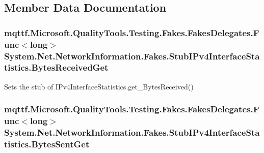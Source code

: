 \subsection{Member Data Documentation}
\hypertarget{class_system_1_1_net_1_1_network_information_1_1_fakes_1_1_stub_i_pv4_interface_statistics_a0b508994533b665567eedb00b1afb581}{
\subsubsection[{Bytes\-Received\-Get}]{\setlength{\rightskip}{0pt plus 5cm}mqttf.\-Microsoft.\-Quality\-Tools.\-Testing.\-Fakes.\-Fakes\-Delegates.\-Func$<$long$>$ System.\-Net.\-Network\-Information.\-Fakes.\-Stub\-I\-Pv4\-Interface\-Statistics.\-Bytes\-Received\-Get}}\label{class_system_1_1_net_1_1_network_information_1_1_fakes_1_1_stub_i_pv4_interface_statistics_a0b508994533b665567eedb00b1afb581}


Sets the stub of I\-Pv4\-Interface\-Statistics.\-get\-\_\-\-Bytes\-Received()

\hypertarget{class_system_1_1_net_1_1_network_information_1_1_fakes_1_1_stub_i_pv4_interface_statistics_a4fb84a8b306b3beab4c79e6e297b8747}{
\subsubsection[{Bytes\-Sent\-Get}]{\setlength{\rightskip}{0pt plus 5cm}mqttf.\-Microsoft.\-Quality\-Tools.\-Testing.\-Fakes.\-Fakes\-Delegates.\-Func$<$long$>$ System.\-Net.\-Network\-Information.\-Fakes.\-Stub\-I\-Pv4\-Interface\-Statistics.\-Bytes\-Sent\-Get}}\label{class_system_1_1_net_1_1_network_information_1_1_fakes_1_1_stub_i_pv4_interface_statistics_a4fb84a8b306b3beab4c79e6e297b8747}



